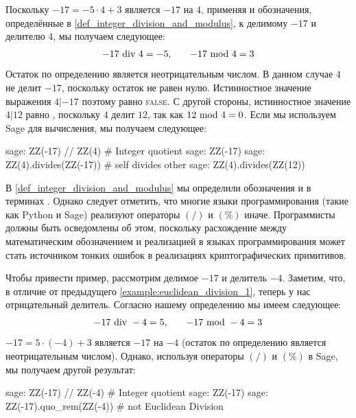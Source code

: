 \begin{example}
\label{example:euclidean_division_1}
 Поскольку $ -17 = -5 \cdot 4 + 3 $ является  $-17$ на $4$, применяя  и обозначения, определённые в \ref{def_integer_division_and_modulus}, к делимому $-17$ и делителю $4$, мы получаем следующее:
\begin{equation}
\begin{array}{lcr}
-17 \text{ div } 4 = - 5, & & -17 \text{ mod } 4 = 3
\end{array}
\end{equation}
Остаток по определению является неотрицательным числом. В данном случае $4$ не делит $-17$, поскольку остаток не равен нулю. Истинностное значение выражения $4 | -17 $ поэтому равно \textsc{false}. С другой стороны, истинностное значение $4 | 12$ равно , поскольку $4$ делит $12$, так как $ 12 \text{ mod } 4 = 0 $. Если мы используем Sage для вычисления, мы получаем следующее:
\begin{sagecommandline}
sage: ZZ(-17) // ZZ(4) # Integer quotient
sage: ZZ(-17) %
sage: ZZ(4).divides(ZZ(-17)) # self divides other
sage: ZZ(4).divides(ZZ(12))
\end{sagecommandline}
\end{example}
\begin{remark} В \ref{def_integer_division_and_modulus} мы определили обозначения  и  в терминах . Однако следует отметить, что многие языки программирования (такие как Python и Sage) реализуют операторы $(/)$ и $(\%)$ иначе. Программисты должны быть осведомлены об этом, поскольку расхождение между математическим обозначением и реализацией в языках программирования может стать источником тонких ошибок в реализациях криптографических примитивов.

Чтобы привести пример, рассмотрим делимое $-17$ и делитель $-4$. Заметим, что, в отличие от предыдущего \examplename{} \ref{example:euclidean_division_1}, теперь у нас отрицательный делитель. Согласно нашему определению мы имеем следующее:
\begin{equation}\label{euclidean-negative}
\begin{array}{lcr}
-17 \text{ div } -4 = 5, & & -17 \text{ mod } -4 = 3
\end{array}
\end{equation}
$ -17 = 5 \cdot (-4) + 3 $ является  $-17$ на $-4$ (остаток по определению является неотрицательным числом). Однако, используя операторы $(/)$ и $(\%)$ в Sage, мы получаем другой результат: 

\begin{sagecommandline}
sage: ZZ(-17) // ZZ(-4) # Integer quotient
sage: ZZ(-17) %
sage: ZZ(-17).quo_rem(ZZ(-4)) # not Euclidean Division
\end{sagecommandline}
\end{remark}

